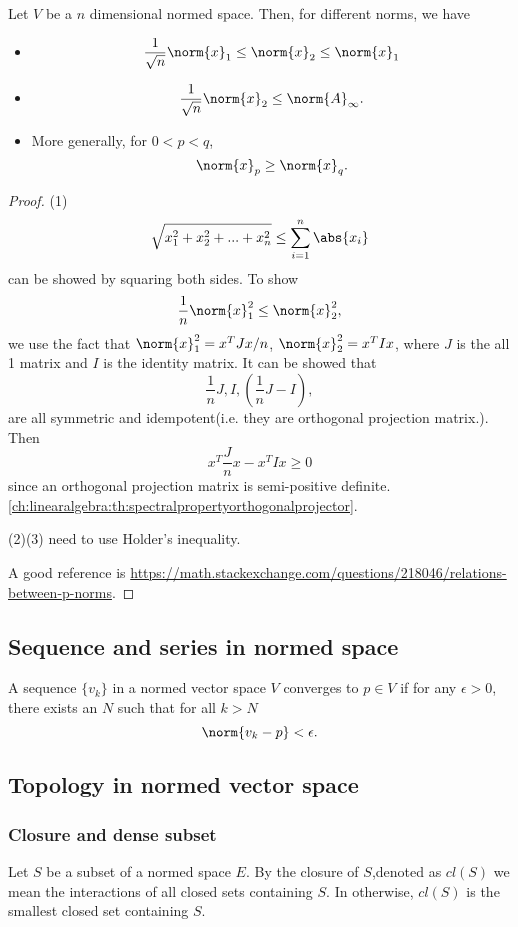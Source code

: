 \begin{refsection}
\begin{lemma}
Let $V$ be a $n$ dimensional normed space. Then, for different norms, we have
\begin{itemize}
	\item $$\frac{1}{\sqrt{n}} \norm{x}_1 \leq \norm{x}_2  \leq \norm{x}_1  $$
	\item $$\frac{1}{\sqrt{n}} \norm{x}_2  \leq \norm{A}_\infty  .$$
	\item More generally, for $0 < p < q$, 
	$$\norm{x}_p \geq \norm{x}_q.$$
\end{itemize}
\end{lemma}
\begin{proof}
(1) 
$$\sqrt{x_1^2 + x_2^2 + ... + x_n^2} \leq \sum_{i=1}^n \abs{x_i}$$
can be showed by squaring both sides. 
To show 
$$\frac{1}{n}\norm{x}_1^2 \leq \norm{x}_2^2, $$
we use the fact that
$\norm{x}_1^2 = x^TJx/n$, $\norm{x}_2^2 = x^TIx$, where $J$ is the all 1 matrix and $I$ is the identity matrix. It can be showed that 
$$\frac{1}{n}J, I, (\frac{1}{n}J - I),$$
are all symmetric and idempotent(i.e. they are orthogonal projection matrix.). Then $$x^T\frac{J}{n}x - x^TIx \geq 0$$
since an orthogonal projection matrix is semi-positive definite. \autoref{ch:linearalgebra:th:spectralpropertyorthogonalprojector}.

(2)(3) need to use Holder's inequality.

A good reference is \url{https://math.stackexchange.com/questions/218046/relations-between-p-norms}.
\end{proof}


\subsection{Sequence and series in normed space}

\begin{definition}\cite[32]{christensen2010functions}
A sequence $\{v_k\}$ in a normed vector space $V$ converges to $p\in V$ if for any $\epsilon > 0$, there exists an $N$ such that for all $k > N$
$$\norm{v_k - p} < \epsilon.$$	
\end{definition}

\subsection{Topology in normed vector space}
\subsubsection{Closure and dense subset}
\begin{definition}[closure]
\cite[15]{debnath2005hilbert}
Let $S$ be a subset of a normed space $E$. By the closure of $S$,denoted as $cl(S)$ we mean the interactions of all closed sets containing $S$. In otherwise, $cl(S)$ is the smallest closed set containing $S$.
\end{definition}




\end{refsection}
